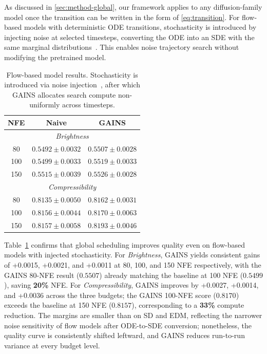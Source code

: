 As discussed in \cref{sec:method-global}, our framework applies to any
diffusion-family model once the transition can be written in the form of
\cref{eq:transition}. For flow-based models with deterministic ODE transitions,
stochasticity is introduced by injecting noise at selected timesteps, converting
the ODE into an SDE with the same marginal
distributions~\citep{dockhorn2024stochastic,kim2025rbf}.
This enables noise trajectory search without modifying the pretrained model.

\begin{table}[t]
\centering
\caption{Flow-based model results. Stochasticity is introduced via noise
injection~\citep{dockhorn2024stochastic}, after which GAINS
allocates search compute non-uniformly across timesteps.}
\label{tab:flow_results}
\begin{tabular}{c|c|c}
\toprule
\textbf{NFE} & \textbf{Naive} & \textbf{GAINS} \\
\midrule
\multicolumn{3}{c}{\textit{Brightness}} \\
\midrule
80  & $0.5492 \pm 0.0032$ & $\mathbf{0.5507 \pm 0.0028}$ \\
100 & $0.5499 \pm 0.0033$ & $\mathbf{0.5519 \pm 0.0033}$ \\
150 & $0.5515 \pm 0.0039$ & $\mathbf{0.5526 \pm 0.0028}$ \\
\midrule
\multicolumn{3}{c}{\textit{Compressibility}} \\
\midrule
80  & $0.8135 \pm 0.0050$ & $\mathbf{0.8162 \pm 0.0031}$ \\
100 & $0.8156 \pm 0.0044$ & $\mathbf{0.8170 \pm 0.0063}$ \\
150 & $0.8157 \pm 0.0058$ & $\mathbf{0.8193 \pm 0.0046}$ \\
\bottomrule
\end{tabular}
\end{table}

Table~\ref{tab:flow_results} confirms that global scheduling improves
quality even on flow-based models with injected stochasticity.
For \textit{Brightness}, GAINS yields consistent gains of
+0.0015, +0.0021, and +0.0011 at 80, 100, and 150 NFE respectively,
with the GAINS 80-NFE result ($0.5507$) already matching the
baseline at 100 NFE ($0.5499$), saving \textbf{20\%} NFE.
For \textit{Compressibility}, GAINS improves by +0.0027, +0.0014,
and +0.0036 across the three budgets;
the GAINS 100-NFE score ($0.8170$) exceeds the baseline at 150 NFE
($0.8157$), corresponding to a \textbf{33\%} compute reduction.
The margins are smaller than on SD and EDM, reflecting the narrower
noise sensitivity of flow models after ODE-to-SDE conversion;
nonetheless, the quality curve is consistently shifted leftward,
and GAINS reduces run-to-run variance at every budget level.
